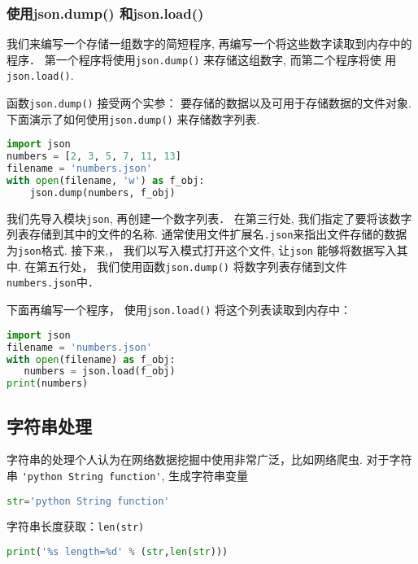 \subsubsection{使用json.dump() 和json.load()}
我们来编写一个存储一组数字的简短程序, 再编写一个将这些数字读取到内存中的程序． 第一个程序将使用\verb|json.dump()| 来存储这组数字, 而第二个程序将使
用\verb|json.load()|.

函数\verb|json.dump()| 接受两个实参： 要存储的数据以及可用于存储数据的文件对象. 下面演示了如何使用\verb|json.dump()| 来存储数字列表.
\begin{lstlisting}[language=python]
import json
numbers = [2, 3, 5, 7, 11, 13]
filename = 'numbers.json'
with open(filename, 'w') as f_obj:
    json.dump(numbers, f_obj)
\end{lstlisting}
我们先导入模块\verb|json|, 再创建一个数字列表． 在第三行处, 我们指定了要将该数字列表存储到其中的文件的名称. 通常使用文件扩展名\verb|.json|来指出文件存储的数据为\verb|json|格式. 接下来,， 我们以写入模式打开这个文件, 让\verb|json| 能够将数据写入其中. 在第五行处， 我们使用函数\verb|json.dump()| 将数字列表存储到文件\verb|numbers.json|中．

下面再编写一个程序， 使用\verb|json.load()| 将这个列表读取到内存中：

\begin{lstlisting}[language=python]
import json
filename = 'numbers.json'
with open(filename) as f_obj:
   numbers = json.load(f_obj)
print(numbers)
\end{lstlisting}








\subsection{字符串处理}
字符串的处理个人认为在网络数据挖掘中使用非常广泛，比如网络爬虫. 对于字符串 \verb|'python String function'|, 生成字符串变量
\begin{lstlisting}[language=python]
str='python String function'
\end{lstlisting}
字符串长度获取：\verb|len(str)|
\begin{lstlisting}[language=python]
print('%s length=%d' % (str,len(str)))
\end{lstlisting}



